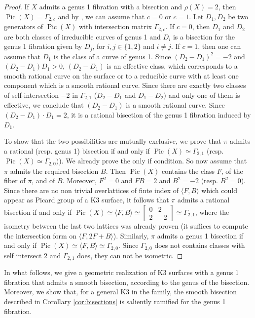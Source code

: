 \documentclass{amsart}
\theoremstyle{definition}
\numberwithin{equation}{section}
\DeclareMathOperator{\Pic}{Pic}
\begin{document}
\begin{proof}
If $X$ admits a genus 1 fibration with a bisection and $\rho(X)=2$, then $\Pic(X)=\Gamma_{2,c}$ and by \cite[Proposition 3.7]{vanGeemen}, we can assume that $c=0$ or $c=1$. Let $D_1, D_2$ be two generators of $\Pic(X)$ with intersection matrix $\Gamma_{2,c}$. If $c=0$, then $D_1$ and $D_2$ are both classes of irreducible curves of genus 1 and $D_i$ is a bisection for the genus 1 fibration given by $D_j$, for $i,j\in \{1,2\}$ and $i\neq j$. If $c=1$, then one can assume that $D_1$ is the class of a curve of genus 1. Since $(D_2-D_1)^2=-2$ and $(D_2-D_1)D_1>0$, $(D_2-D_1)$ is an effective class, which corresponds to a smooth rational curve on the surface or to a reducible curve with at least one component which is a smooth rational curve. Since there are exactly two classes of self-intersection $-2$ in $\Gamma_{2,1}$ ($D_2-D_1$ and $D_1-D_2$) and only one of them is effective, we conclude that $(D_2-D_1)$ is a smooth rational curve. Since $(D_2-D_1)\cdot D_1=2$, it is a rational bisection of the genus 1 fibration induced by $D_1$.  

To show that the two possibilities are mutually exclusive, we prove that $\pi$ admits a rational (resp. genus 1) bisection if and only if $\Pic(X)\simeq \Gamma_{2,1}$ (resp. $\Pic(X)\simeq \Gamma_{2,0})$). We already prove the only if condition. So now assume that $\pi$ admits the required bisection $B$. Then $\Pic(X)$ contains the class $F$, of the fiber of $\pi$, and of $B$. Moreover, $F^2=0$ and $FB=2$ and $B^2=-2$ (resp. $B^2=0$). Since there are no non trivial overlattices of finte index of $\langle F,B\rangle$ which could appear as Picard group of a K3 surface, it follows that $\pi$ admits a rational bisection if and only if $\Pic(X)\simeq \langle F,B\rangle\simeq \left[\begin{array}{cc}0&2\\2&-2\end{array}\right]\simeq \Gamma_{2,1}$, where the isometry between the last two lattices was already proven (it suffices to compute the intersection form on $\langle F,2F+B\rangle$). Similarly, $\pi$ admits a genus 1 bisection if and only if $\Pic(X)\simeq \langle F,B\rangle\simeq \Gamma_{2,0}$. Since $\Gamma_{2,0}$ does not contains classes with self intersect 2 and $\Gamma_{2,1}$ does, they can not be isometric.
\end{proof}

In what follows, we give a geometric realization of K3 surfaces with a genus 1 fibration that admits a smooth bisection, according to the genus of the bisection. Moreover, we show that, for a general K3 in the family, the smooth bisection described in Corollary \ref{cor:bisections} is saliently ramified for the genus 1 fibration.
\end{document}
